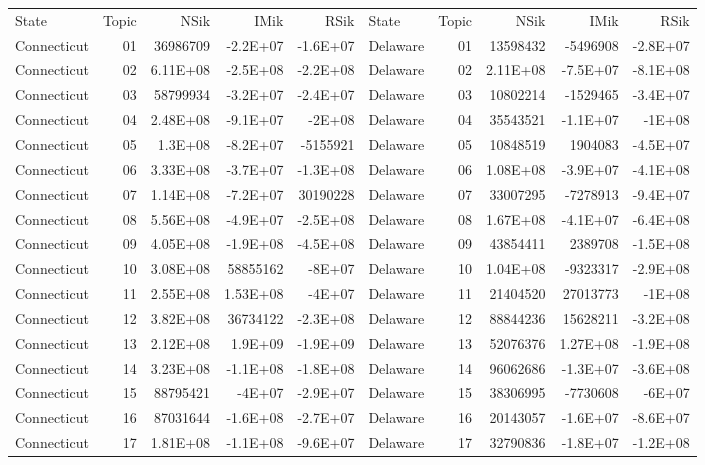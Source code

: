 \begin{table}[]
	\footnotesize
	\begin{tabular}{lrrrrlrrrr}
		State & Topic & NSik & IMik & RSik & State & Topic & NSik & IMik & RSik \\
		Connecticut &  01  & 36986709 & -2.2E+07 & -1.6E+07 & Delaware &  01  & 13598432 & -5496908 & -2.8E+07 \\
		Connecticut &  02  & 6.11E+08 & -2.5E+08 & -2.2E+08 & Delaware &  02  & 2.11E+08 & -7.5E+07 & -8.1E+08 \\
		Connecticut &  03  & 58799934 & -3.2E+07 & -2.4E+07 & Delaware &  03  & 10802214 & -1529465 & -3.4E+07 \\
		Connecticut &  04  & 2.48E+08 & -9.1E+07 & -2E+08 & Delaware &  04  & 35543521 & -1.1E+07 & -1E+08 \\
		Connecticut &  05  & 1.3E+08 & -8.2E+07 & -5155921 & Delaware &  05  & 10848519 & 1904083 & -4.5E+07 \\
		Connecticut &  06  & 3.33E+08 & -3.7E+07 & -1.3E+08 & Delaware &  06  & 1.08E+08 & -3.9E+07 & -4.1E+08 \\
		Connecticut &  07  & 1.14E+08 & -7.2E+07 & 30190228 & Delaware &  07  & 33007295 & -7278913 & -9.4E+07 \\
		Connecticut &  08  & 5.56E+08 & -4.9E+07 & -2.5E+08 & Delaware &  08  & 1.67E+08 & -4.1E+07 & -6.4E+08 \\
		Connecticut &  09  & 4.05E+08 & -1.9E+08 & -4.5E+08 & Delaware &  09  & 43854411 & 2389708 & -1.5E+08 \\
		Connecticut &  10 & 3.08E+08 & 58855162 & -8E+07 & Delaware &  10 & 1.04E+08 & -9323317 & -2.9E+08 \\
		Connecticut &  11 & 2.55E+08 & 1.53E+08 & -4E+07 & Delaware &  11 & 21404520 & 27013773 & -1E+08 \\
		Connecticut &  12 & 3.82E+08 & 36734122 & -2.3E+08 & Delaware &  12 & 88844236 & 15628211 & -3.2E+08 \\
		Connecticut &  13 & 2.12E+08 & 1.9E+09 & -1.9E+09 & Delaware &  13 & 52076376 & 1.27E+08 & -1.9E+08 \\
		Connecticut &  14 & 3.23E+08 & -1.1E+08 & -1.8E+08 & Delaware &  14 & 96062686 & -1.3E+07 & -3.6E+08 \\
		Connecticut &  15 & 88795421 & -4E+07 & -2.9E+07 & Delaware &  15 & 38306995 & -7730608 & -6E+07 \\
		Connecticut &  16 & 87031644 & -1.6E+08 & -2.7E+07 & Delaware &  16 & 20143057 & -1.6E+07 & -8.6E+07 \\
		Connecticut &  17 & 1.81E+08 & -1.1E+08 & -9.6E+07 & Delaware &  17 & 32790836 & -1.8E+07 & -1.2E+08 \\

\end{tabular}
\end{table}
